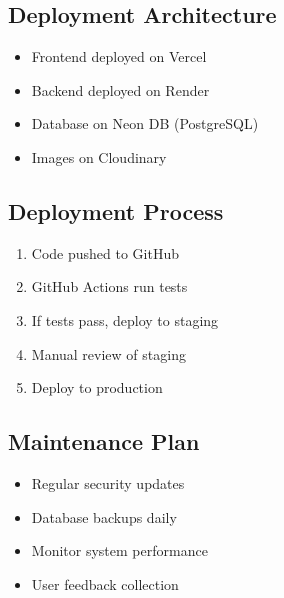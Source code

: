 \subsection{Deployment Architecture}
\begin{itemize}[leftmargin=*]
	\item Frontend deployed on Vercel
	\item Backend deployed on Render
	\item Database on Neon DB (PostgreSQL)
	\item Images on Cloudinary
\end{itemize}

\subsection{Deployment Process}
\begin{enumerate}[leftmargin=*]
	\item Code pushed to GitHub
	\item GitHub Actions run tests
	\item If tests pass, deploy to staging
	\item Manual review of staging
	\item Deploy to production
\end{enumerate}

\subsection{Maintenance Plan}
\begin{itemize}[leftmargin=*]
	\item Regular security updates
	\item Database backups daily
	\item Monitor system performance
	\item User feedback collection
\end{itemize}
